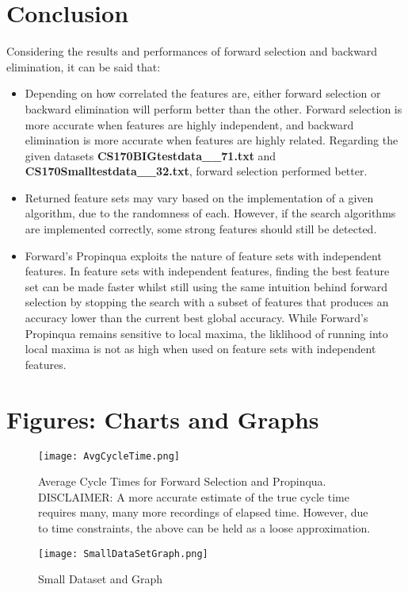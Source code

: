 \documentclass{article}
\begin{document}
\section{Conclusion}
Considering the results and performances of forward selection and backward
elimination, it can be said that:
\begin{itemize}
\item Depending on how correlated the features are, either forward selection
  or backward elimination will perform better than the other. Forward
  selection is more accurate when features are highly independent, and
  backward elimination is more accurate when features are highly related.
  Regarding the given datasets \textbf{CS170BIGtestdata\_\_71.txt} and
  \textbf{CS170Smalltestdata\_\_32.txt}, forward selection performed better.
\item Returned feature sets may vary based on the implementation of a given
  algorithm, due to the randomness of each. However, if the search algorithms
  are implemented correctly, some strong features should still be detected.
\item Forward's Propinqua exploits the nature of feature sets with independent
  features. In feature sets with independent features, finding the best feature
  set can be made faster whilst still using the same intuition behind forward
  selection by stopping the search with a subset of features that produces an
  accuracy lower than the current best global accuracy. While Forward's
  Propinqua remains sensitive to local maxima, the liklihood of running into
  local maxima is not as high when used on feature sets with independent features.
 
\end{itemize}

\section{Figures: Charts and Graphs}

  \begin{figure}[!h]
  \centering
  \texttt{[image: AvgCycleTime.png]}
  \caption{Average Cycle Times for Forward Selection and Propinqua. DISCLAIMER: A more accurate estimate of the true cycle time requires many, many more
recordings of elapsed time. However, due to time constraints, the above can be
held as a loose approximation.}
\end{figure}
\clearpage

   \begin{figure}[!h]
  \texttt{[image: SmallDataSetGraph.png]}
  \caption{Small Dataset and Graph}
\end{figure}
\clearpage
\end{document}

